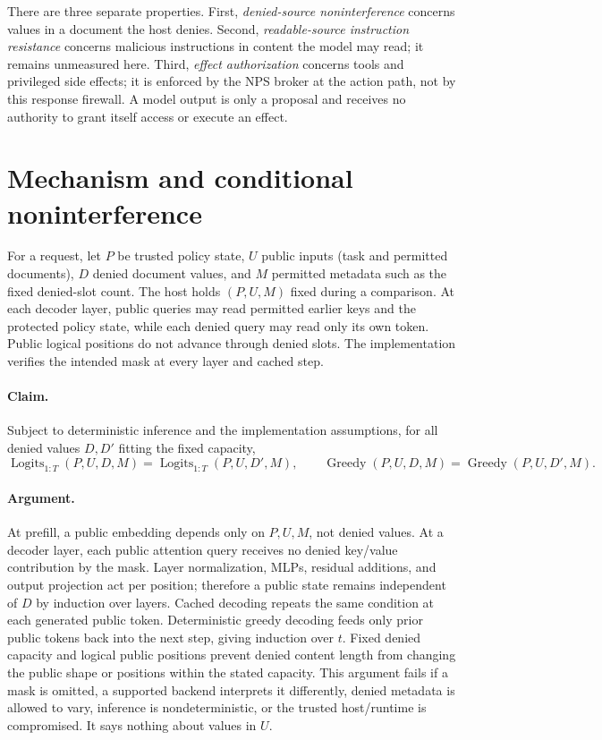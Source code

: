 \documentclass[11pt]{article}
\begin{document}
There are three separate properties. First, \emph{denied-source noninterference} concerns values in a document the host denies. Second, \emph{readable-source instruction resistance} concerns malicious instructions in content the model may read; it remains unmeasured here. Third, \emph{effect authorization} concerns tools and privileged side effects; it is enforced by the NPS broker at the action path, not by this response firewall. A model output is only a proposal and receives no authority to grant itself access or execute an effect.

\section{Mechanism and conditional noninterference}

For a request, let $P$ be trusted policy state, $U$ public inputs (task and permitted documents), $D$ denied document values, and $M$ permitted metadata such as the fixed denied-slot count. The host holds $(P,U,M)$ fixed during a comparison. At each decoder layer, public queries may read permitted earlier keys and the protected policy state, while each denied query may read only its own token. Public logical positions do not advance through denied slots. The implementation verifies the intended mask at every layer and cached step.

\paragraph{Claim.} Subject to deterministic inference and the implementation assumptions, for all denied values $D,D'$ fitting the fixed capacity,
\begin{equation}
  \operatorname{Logits}_{1:T}(P,U,D,M)=\operatorname{Logits}_{1:T}(P,U,D',M),
  \qquad \operatorname{Greedy}(P,U,D,M)=\operatorname{Greedy}(P,U,D',M).
\end{equation}

\paragraph{Argument.} At prefill, a public embedding depends only on $P,U,M$, not denied values. At a decoder layer, each public attention query receives no denied key/value contribution by the mask. Layer normalization, MLPs, residual additions, and output projection act per position; therefore a public state remains independent of $D$ by induction over layers. Cached decoding repeats the same condition at each generated public token. Deterministic greedy decoding feeds only prior public tokens back into the next step, giving induction over $t$. Fixed denied capacity and logical public positions prevent denied content length from changing the public shape or positions within the stated capacity. This argument fails if a mask is omitted, a supported backend interprets it differently, denied metadata is allowed to vary, inference is nondeterministic, or the trusted host/runtime is compromised. It says nothing about values in $U$.
\end{document}
